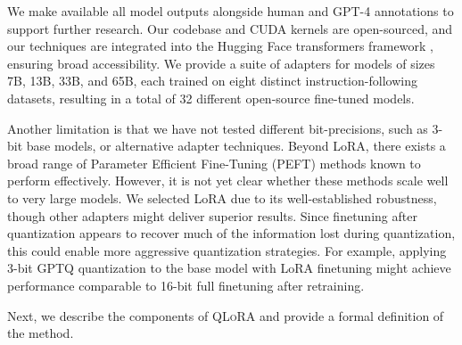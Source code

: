 We make available all model outputs alongside human and GPT-4 annotations to support further research. Our codebase and CUDA kernels are open-sourced, and our techniques are integrated into the Hugging Face transformers framework \citep{wolf2019huggingface}, ensuring broad accessibility. We provide a suite of adapters for models of sizes 7B, 13B, 33B, and 65B, each trained on eight distinct instruction-following datasets, resulting in a total of 32 different open-source fine-tuned models.

Another limitation is that we have not tested different bit-precisions, such as 3-bit base models, or alternative adapter techniques. Beyond LoRA, there exists a broad range of Parameter Efficient Fine-Tuning (PEFT) methods known to perform effectively. However, it is not yet clear whether these methods scale well to very large models. We selected LoRA due to its well-established robustness, though other adapters might deliver superior results. Since finetuning after quantization appears to recover much of the information lost during quantization, this could enable more aggressive quantization strategies. For example, applying 3-bit GPTQ quantization to the base model with LoRA finetuning might achieve performance comparable to 16-bit full finetuning after retraining.

Next, we describe the components of \textsc{QLoRA} and provide a formal definition of the method.

